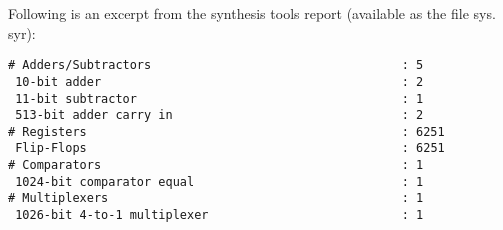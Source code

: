 \documentclass[a4paper, 12pt]{article}
\begin{document}
Following is an excerpt from the synthesis tools report (available as the file sys.
syr):

\begin{verbatim}
# Adders/Subtractors                                   : 5
 10-bit adder                                          : 2
 11-bit subtractor                                     : 1
 513-bit adder carry in                                : 2
# Registers                                            : 6251
 Flip-Flops                                            : 6251
# Comparators                                          : 1
 1024-bit comparator equal                             : 1
# Multiplexers                                         : 1
 1026-bit 4-to-1 multiplexer                           : 1
\end{verbatim}

\filbreak



\end{document}
